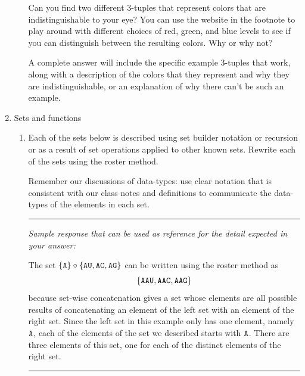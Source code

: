 \begin{enumerate}[labelindent=0pt, leftmargin=0pt]
\begin{enumerate}[labelindent=0pt, leftmargin=0pt]
        Can you find two different $3$-tuples that represent colors that are indistinguishable to your eye? You can use the website in the footnote to play around
        with different choices of red, green, and blue levels to see if you can distinguish between the resulting colors.
        Why or why not? 

        A complete answer will include the specific example $3$-tuples that work, along with a description of the colors that they represent and why they
        are indistinguishable, or an explanation of why there can't be such an example.
    \end{enumerate}

    \item Sets and functions
    \begin{enumerate}
        \item \gradeCorrectFirst Each of the sets below is described 
using set builder notation or recursion or as a result of set operations
applied to other known sets.  Rewrite each of the sets using the roster method.

Remember our discussions of data-types: use clear notation that 
is consistent with our class notes and definitions 
to communicate the data-types of the elements in each set.


\rule{0.5\textwidth}{.4pt}

{\it Sample response that can be used as reference for the detail expected 
in your answer:} 

The set $\{ \texttt{A} \} \circ \{ \texttt{A}\texttt{U}, \texttt{A}\texttt{C}, \texttt{A}\texttt{G}\}$ can be written using
the roster method as 
\[
\{ \texttt{A}\texttt{A}\texttt{U}, \texttt{A}\texttt{A}\texttt{C}, \texttt{A}\texttt{A}\texttt{G} \}
\]
because set-wise concatenation gives a set whose elements are 
all possible results of concatenating an element of the 
left set with an 
element of the right set. Since the left set in this example only
has one element, namely $\texttt{A}$, each of the elements of the set we 
described starts with $\texttt{A}$. There are three elements of this set, 
one for each of the distinct elements of the right set.

\rule{0.5\textwidth}{.4pt}


\end{enumerate}
\end{enumerate}
